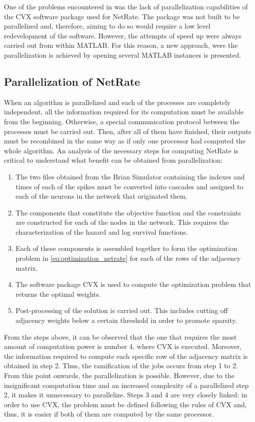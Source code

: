 One of the problems encountered in \cite{pranav_report} was the lack of parallelization capabilities of the CVX software package used for NetRate. The package was not built to be parallelized and, therefore, aiming to do so would require a low level redevelopment of the software. However, the attempts of speed up were always carried out from within MATLAB. For this reason, a new approach, were the parallelization is achieved by opening several MATLAB instances is presented.

\subsection{Parallelization of NetRate}

When an algorithm is parallelized and each of the processes are completely independent, all the information required for its computation must be available from the beginning. Otherwise, a special communication protocol between the processes must be carried out. Then, after all of them have finished, their outputs must be recombined in the same way as if only one processor had computed the whole algorithm. An analysis of the necessary steps for computing NetRate is critical to understand what benefit can be obtained from parallelization:

\begin{enumerate}
\item The two files obtained from the Brian Simulator containing the indexes and times of each of the spikes must be converted into cascades and assigned to each of the neurons in the network that originated them.
\item The components that constitute the objective function and the constraints are constructed for each of the nodes in the network. This requires the characterization of the hazard and log survival functions.
\item Each of these components is assembled together to form the optimization problem in \ref{eq:optimization_netrate} for each of the rows of the adjacency matrix.
\item The software package CVX is used to compute the optimization problem that returns the optimal weights.
\item Post-processing of the solution is carried out. This includes cutting off adjacency weights below a certain threshold in order to promote sparsity.
\end{enumerate}

From the steps above, it can be observed that the one that requires the most amount of computation power is number 4, where CVX is executed. Moreover, the information required to compute each specific row of the adjacency matrix is obtained in step 2. Thus, the ramification of the jobs occurs from step 1 to 2. From this point onwards, the parallelization is possible. However, due to the insignificant computation time and an increased complexity of a parallelized step 2, it makes it unnecessary to parallelize. 
Steps 3 and 4 are very closely linked: in order to use CVX, the problem must be defined following the rules of CVX and, thus, it is easier if both of them are computed by the same processor.\\

